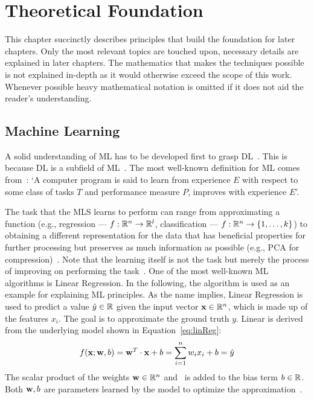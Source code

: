 \cleardoublepage%
\chapter{Theoretical Foundation}\label{ch:theoretical}
This chapter succinctly describes principles that build the foundation for later chapters.
Only the most relevant topics are touched upon, necessary details are explained in later chapters.
The mathematics that makes the techniques possible is not explained in-depth as it would otherwise
exceed the scope of this work.
Whenever possible heavy mathematical notation is omitted if it does not aid the reader's
understanding.

\section{Machine Learning}
A solid understanding of \ac{ML} has to be developed
first to grasp \ac{DL}~\citep{goodfellow_deep_2016}.
This is because \ac{DL} is a subfield of \ac{ML}~\citep{chauhan_review_2018}.
The most well-known definition for \ac{ML} comes from~\cite{mitchell_machine_1997}:
`A computer program is said to learn from experience $E$ with respect to some class of tasks $T$
and performance measure $P$, improves with experience $E$'.

The task that the \ac{MLS} learns to perform can range from approximating a function
(e.g., regression --- $f:\mathbb{R}^n \rightarrow \mathbb{R}^l$, classification ---
$f:\mathbb{R}^n \rightarrow \{1,\ldots,k\}$) to obtaining a different representation for the data that
has beneficial properties for further processing but preserves as much information as possible
(e.g., PCA for compression)~\citep{goodfellow_deep_2016}.
Note that the learning itself is not the task but merely the process of improving on performing the
task~\citep{goodfellow_deep_2016}.
One of the most well-known \ac{ML} algorithms is Linear Regression.
In the following, the algorithm is used as an example for explaining \ac{ML} principles.
As the name implies, Linear Regression is used to predict a value $\hat{y}\in\mathbb{R}$ given the input vector
$\textbf{x}\in\mathbb{R}^n$, which is made up of the features $x_i$.
The goal is to approximate the ground truth $y$.
Linear is derived from the underlying model shown in Equation~\ref{eq:linReg}:
\begin{equation}\label{eq:linReg}
    f(\textbf{x};\textbf{w},b) = \textbf{w}^{T} \cdot \textbf{x} + b = \sum_{i=1}^{n} w_i x_i + b = \hat{y}
\end{equation}
The scalar product of the weights $\textbf{w}\in\mathbb{R}^n$ and \x\ is added to the bias term $b\in\mathbb{R}$.
Both $\textbf{w},b$ are parameters learned by the model to optimize the
approximation~\citep{goodfellow_deep_2016}.

